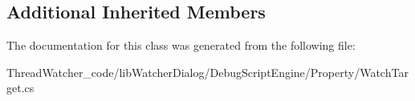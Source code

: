 \subsection*{Additional Inherited Members}


The documentation for this class was generated from the following file\+:\begin{DoxyCompactItemize}
\item 
Thread\+Watcher\+\_\+code/lib\+Watcher\+Dialog/\+Debug\+Script\+Engine/\+Property/Watch\+Target.\+cs\end{DoxyCompactItemize}
